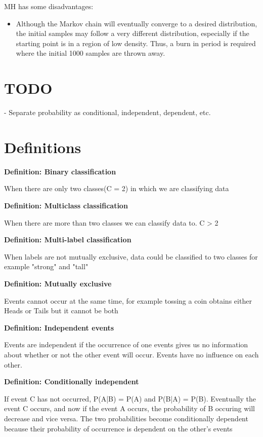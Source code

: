 \documentclass[11pt]{article}
\newcommand{\define}[2] {
  \textbf{Definition: #1}
  \begin{center} #2
\end{center}
}
\begin{document}
MH has some disadvantages:
\begin{itemize}
\item Although the Markov chain will eventually converge to a desired distribution, the initial samples may follow a very different distribution, especially if the starting point is in a region of low density. Thus, a burn in period is required where the initial 1000 samples are thrown away.
\end{itemize}

\section{TODO}
- Separate probability as conditional, independent, dependent, etc.

\section{Definitions}
\define{Binary classification}{When there are only two classes(C = 2) in which we are classifying data}
\define{Multiclass classification}{When there are more than two classes we can classify data to. C > 2}
\define{Multi-label classification}{When labels are not mutually exclusive, data could be classified to two classes for example "strong" and "tall"}
\define{Mutually exclusive}{Events cannot occur at the same time, for example tossing a coin obtains either Heads or Tails but it cannot be both}
\define{Independent events}{Events are independent if the occurrence of one events gives us no information about whether or not the other event will occur. Events have no influence on each other.}
\define{Conditionally independent}{If event C has not occurred, P(A|B) = P(A) and P(B|A) = P(B). Eventually the event C occurs, and now if the event A occurs, the probability of B occuring will decrease and vice versa. The two probabilities become conditionally dependent because their probability of occurrence is dependent on the other's events}
\end{document}
